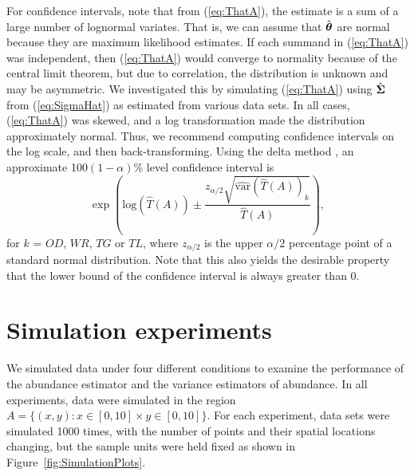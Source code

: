 \documentclass[12pt, titlepage]{article}\usepackage[]{graphicx}\usepackage[]{color}
\def\btheta{\mbox{\boldmath $\theta$}}
\def\bSigma{\mbox{\boldmath $\Sigma$}}
\def\var{\textrm{var}}
\def\log{\textrm{log}}
\begin{document}
For confidence intervals, note that from (\ref{eq:ThatA}), the estimate is a sum of a large number of lognormal variates.  That is, we can assume that $\hat{\btheta}$ are normal because they are maximum likelihood estimates.  If each summand in (\ref{eq:ThatA}) was independent, then (\ref{eq:ThatA}) would converge to normality because of the central limit theorem, but due to correlation, the distribution is unknown and may be asymmetric.  We investigated this by simulating (\ref{eq:ThatA}) using $\hat{\bSigma}$ from (\ref{eq:SigmaHat}) as estimated from various data sets.  In all cases, (\ref{eq:ThatA}) was skewed, and a log transformation made the distribution approximately normal. Thus, we recommend computing confidence intervals on the log scale, and then back-transforming.  Using the delta method \citep{Dorf:a:1938, Ver:who:2012}, an approximate 100$(1-\alpha)$\% level confidence interval is
\begin{equation} \label{eq:CI}
  \exp \left( \log(\hat{T}(A)) \pm \frac{z_{\alpha/2}\sqrt{\widehat{\var}(\hat{T}(A))_k}}{\hat{T}(A)} \right),
\end{equation}
for $k$ = $OD$, $WR$, $TG$ or $TL$, where $z_{\alpha/2}$ is the upper $\alpha/2$ percentage point of a standard normal distribution.  Note that this also yields the desirable property that the lower bound of the confidence interval is always greater than 0.


\section{Simulation experiments}\label{SimExp}

We simulated data under four different conditions to examine the performance of the abundance estimator and the variance estimators of abundance.  In all experiments, data were simulated in the region $A = \{(x,y): x \in [0,10] \times y \in [0,10]\}$. For each experiment, data sets were simulated 1000 times, with the number of points and their spatial locations changing, but the sample units were held fixed as shown in Figure~\ref{fig:SimulationPlots}.
\end{document}
